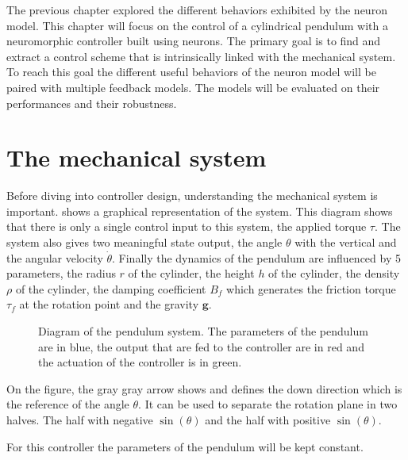 \label{sec:pendulum}

The previous chapter explored the different behaviors exhibited by the neuron model.
This chapter will focus on the control of a cylindrical pendulum with a neuromorphic controller built using neurons.
The primary goal is to find and extract a control scheme that is intrinsically linked with the mechanical system.
To reach this goal the different useful behaviors of the neuron model will be paired with multiple feedback models. 
The models will be evaluated on their performances and their robustness.

\section{The mechanical system}

Before diving into controller design, understanding the mechanical system is important. 
 shows a graphical representation of the system. 
This diagram shows that there is only a single control input to this system, the applied torque $\tau$. 
The system also gives two meaningful state output, the angle $\theta$ with the vertical and the angular velocity $\dot{\theta}$. 
Finally the dynamics of the pendulum are influenced by 5 parameters, the radius $r$ of the cylinder, the height $h$ of the cylinder, the density $\rho$ of the cylinder, the damping coefficient $B_f$ which generates the friction torque $\tau_f$ at the rotation point and the gravity $\mathbf{g}$. 
\begin{figure}[!htb]
    \centering
    \caption{Diagram of the pendulum system. The parameters of the pendulum are in blue, the output that are fed to the controller are in red and the actuation of the controller is in green.}
    \label{fig:pendulum}
\end{figure}

On the figure, the gray gray arrow shows and defines the down direction which is the reference of the angle $\theta$. 
It can be used to separate the rotation plane in two halves. 
The half with negative $\sin\left(\theta\right)$ and the half with positive $\sin\left(\theta\right)$.

For this controller the parameters of the pendulum will be kept constant. 

